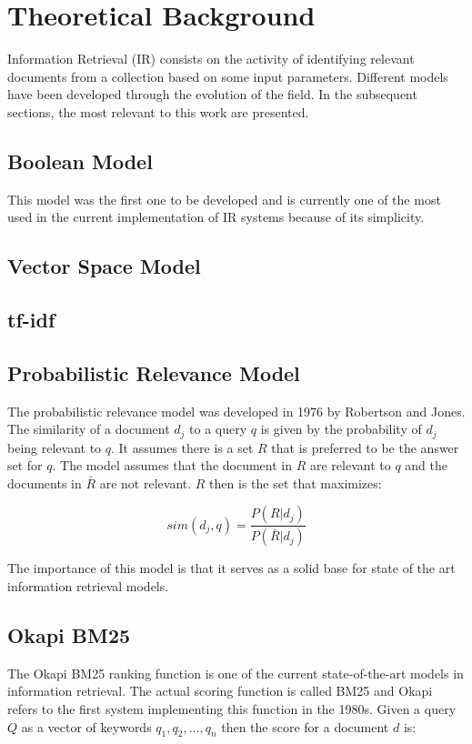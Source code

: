 \chapter{Theoretical Background}
\label{chapter-theoretical_background}
Information Retrieval (IR) consists on the activity of identifying relevant documents from a collection based on some input parameters.
Different models have been developed through the evolution of the field. In the subsequent sections, the most relevant to this work are presented.

\section{Boolean Model}
This model was the first one to be developed and is currently one of the most used in the current implementation of IR systems because of its simplicity.

\section{Vector Space Model}

\section{tf-idf}

\section{Probabilistic Relevance Model}
The probabilistic relevance model was developed in 1976 by Robertson and Jones\cite{probabilistic_relevance_model}. The similarity of a document $d_{j}$ to a query $q$ is given by the probability of $d_{j}$ being relevant to $q$. It assumes there is a set $R$ that is preferred to be the answer set for $q$. The model assumes that the document in $R$ are relevant to $q$ and the documents in $\bar{R}$ are not relevant. $R$ then is the set that maximizes:

$$sim(d_{j},q) = \frac{ P(R|d_{j})} {P(\bar{R} |d_{j})} $$

The importance of this model is that it serves as a solid base for state of the art information retrieval models.

\section{Okapi BM25}

The Okapi BM25 ranking function is one of the current state-of-the-art models in information retrieval\cite{okapibm25}. The actual scoring function is called BM25 and Okapi refers to the first system implementing this function in the 1980s. 
Given a query $Q$ as a vector of keywords $q_{1}, q_{2}, ... , q_{n}$ then the score for a document $d$ is:

